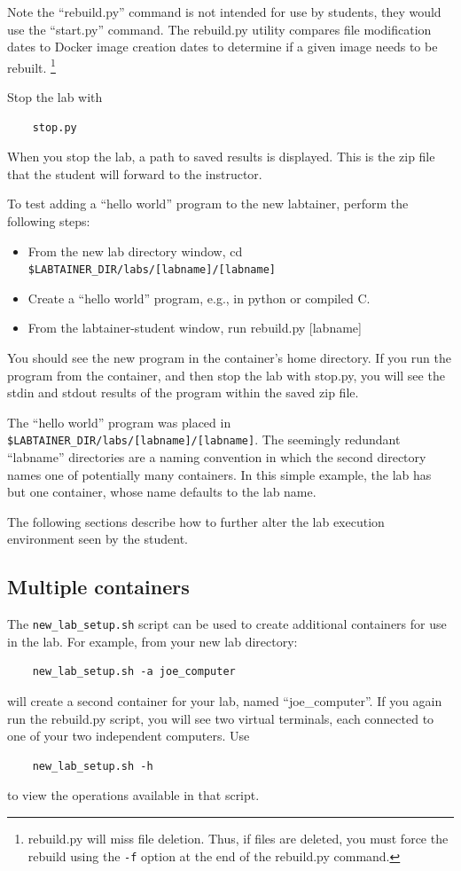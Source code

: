 \documentclass[12pt]{article}
\begin{document}
Note the ``rebuild.py'' command is not intended for use by students, they would use the ``start.py'' command.  
The rebuild.py utility compares file modification dates to Docker image creation dates to determine if
a given image needs to be rebuilt.  \footnote{rebuild.py will miss file deletion.  Thus, if files are deleted, you must
force the rebuild using the {\tt -f} option at the end of the rebuild.py command.}

Stop the lab with 
\begin{verbatim}
    stop.py 
\end{verbatim}
When you stop the lab, a path to saved results is displayed.
This is the zip file that the student will forward to the instructor.

To test adding a ``hello world'' program to the new labtainer, perform the following steps:
\begin{itemize}
\item From the new lab directory window, cd \verb!$LABTAINER_DIR/labs/[labname]/[labname]!
\item Create a ``hello world'' program, e.g., in python or compiled C.
\item From the labtainer-student window, run rebuild.py [labname]
\end{itemize}
    
You should see the new program in the container's
home directory.  If you run the program from the container, and then stop the lab
with stop.py, you will see the stdin and stdout results of the program within the
saved zip file.

The ``hello world'' program was placed in \verb!$LABTAINER_DIR/labs/[labname]/[labname]!.
The seemingly redundant ``labname'' directories are a naming convention in which the
second directory names one of potentially many containers.  In this simple example,
the lab has but one container, whose name defaults to the lab name.

The following sections describe how to further alter the lab execution environment seen by 
the student.

\subsection {Multiple containers}
The {\tt new\_lab\_setup.sh} script can be used to create additional containers for use
in the lab.  For example, from your new lab directory:
\begin{verbatim}
    new_lab_setup.sh -a joe_computer
\end{verbatim}
\noindent will create a second container for your lab,
named ``joe\_computer''.  If you again run the rebuild.py script, you will see two virtual
terminals, each connected to one of your two independent computers.  Use 
\begin{verbatim}
    new_lab_setup.sh -h
\end{verbatim}
\noindent to view the operations available in that script.
\end{document}
